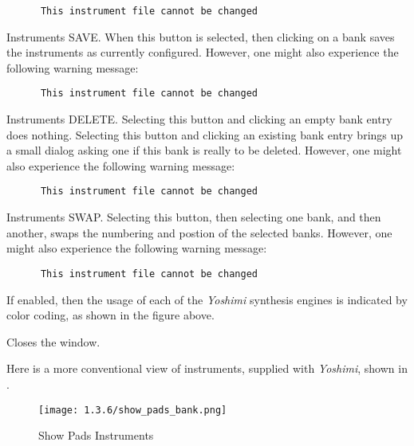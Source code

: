    \begin{verbatim}
      This instrument file cannot be changed
   \end{verbatim}

   Instruments SAVE.
   When this button is selected, then clicking on a bank saves
   the instruments as currently configured.
   However, one might also experience the following warning message:

   \begin{verbatim}
      This instrument file cannot be changed
   \end{verbatim}

   Instruments DELETE.
   Selecting this button and clicking an empty bank entry does nothing.
   Selecting this button and clicking an existing bank entry brings up a
   small dialog asking one if this bank is really to be deleted.
   However, one might also experience the following warning message:

   \begin{verbatim}
      This instrument file cannot be changed
   \end{verbatim}

   Instruments SWAP.
   Selecting this button, then selecting one bank, and then another,
   swaps the numbering and postion of the selected banks.
   However, one might also experience the following warning message:

   \begin{verbatim}
      This instrument file cannot be changed
   \end{verbatim}

   If enabled, then the usage of each of the \textsl{Yoshimi} synthesis
   engines is indicated by color coding, as shown in the figure above.

   Closes the window.

   Here is a more conventional view of instruments, supplied with
   \textsl{Yoshimi}, shown in
   .

\begin{figure}[H]
   \centering 
   \texttt{[image: 1.3.6/show\_pads\_bank.png]}
   \caption[Show Pads Instruments]{Show Pads Instruments}
   \label{fig:show_pads_bank}
\end{figure}

